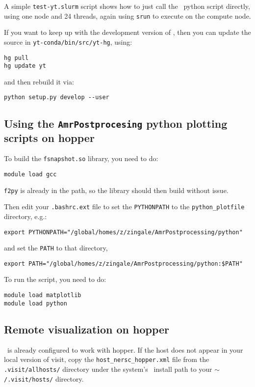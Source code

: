 A simple {\tt test-yt.slurm} script shows how to just call the
\yt\ python script directly, using one node and 24 threads, again
using {\tt srun} to execute on the compute node.

If you want to keep up with the development version of \yt, then you
can update the source in {\tt yt-conda/bin/src/yt-hg}, using:
\begin{verbatim}
hg pull
hg update yt
\end{verbatim}
and then rebuild it via:
\begin{verbatim}
python setup.py develop --user
\end{verbatim}


\subsection{Using the {\tt AmrPostprocesing} python plotting scripts on hopper}

To build the {\tt fsnapshot.so} library, you need to do:
\begin{verbatim}
module load gcc
\end{verbatim}
{\tt f2py} is already in the path, so the library should then build without issue.
%

Then edit your {\tt .bashrc.ext} file to set the {\tt PYTHONPATH} to
the {\tt python\_plotfile} directory, e.g.:
\begin{verbatim}
export PYTHONPATH="/global/homes/z/zingale/AmrPostprocessing/python"
\end{verbatim}
%
and set the {\tt PATH} to that directory,
\begin{verbatim}
export PATH="/global/homes/z/zingale/AmrPostprocessing/python:$PATH"
\end{verbatim}

To run the script, you need to do:
\begin{verbatim}
module load matplotlib
module load python
\end{verbatim}



\subsection{Remote visualization on hopper}

\visit\ is already configured to work with hopper.  If the host does not appear
in your local version of visit, copy the {\tt host\_nersc\_hopper.xml} file
from the {\tt .visit/allhosts/} directory under the system's \visit\ install path
to your {\tt $\mathtt{\sim}$/.visit/hosts/} directory. 



